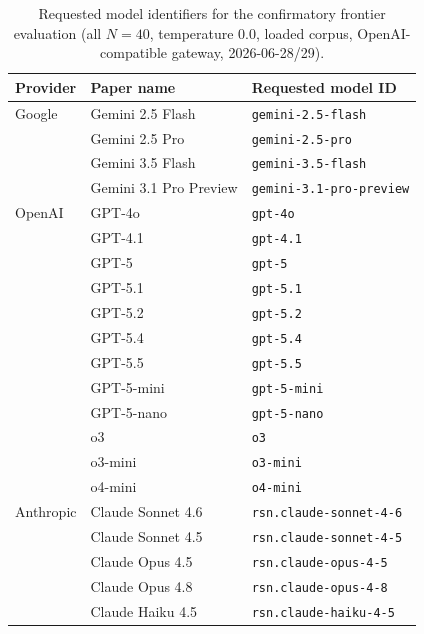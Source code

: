 \documentclass{article}
\begin{document}
\begin{table}[t]
\caption{Requested model identifiers for the confirmatory frontier evaluation (all $N{=}40$, temperature $0.0$, loaded corpus, OpenAI-compatible gateway, 2026-06-28/29).}
\label{tab:provenance}
\centering
\small
\begin{tabular}{lll}
\toprule
\textbf{Provider} & \textbf{Paper name} & \textbf{Requested model ID} \\
\midrule
Google & Gemini 2.5 Flash & \texttt{gemini-2.5-flash} \\
 & Gemini 2.5 Pro & \texttt{gemini-2.5-pro} \\
 & Gemini 3.5 Flash & \texttt{gemini-3.5-flash} \\
 & Gemini 3.1 Pro Preview & \texttt{gemini-3.1-pro-preview} \\
\midrule
OpenAI & GPT-4o & \texttt{gpt-4o} \\
 & GPT-4.1 & \texttt{gpt-4.1} \\
 & GPT-5 & \texttt{gpt-5} \\
 & GPT-5.1 & \texttt{gpt-5.1} \\
 & GPT-5.2 & \texttt{gpt-5.2} \\
 & GPT-5.4 & \texttt{gpt-5.4} \\
 & GPT-5.5 & \texttt{gpt-5.5} \\
 & GPT-5-mini & \texttt{gpt-5-mini} \\
 & GPT-5-nano & \texttt{gpt-5-nano} \\
 & o3 & \texttt{o3} \\
 & o3-mini & \texttt{o3-mini} \\
 & o4-mini & \texttt{o4-mini} \\
\midrule
Anthropic & Claude Sonnet 4.6 & \texttt{rsn.claude-sonnet-4-6} \\
 & Claude Sonnet 4.5 & \texttt{rsn.claude-sonnet-4-5} \\
 & Claude Opus 4.5 & \texttt{rsn.claude-opus-4-5} \\
 & Claude Opus 4.8 & \texttt{rsn.claude-opus-4-8} \\
 & Claude Haiku 4.5 & \texttt{rsn.claude-haiku-4-5} \\
\bottomrule
\end{tabular}
\end{table}
\end{document}
